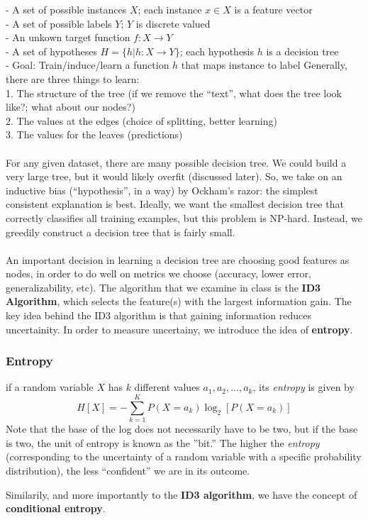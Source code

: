 \documentclass[11 pt]{scrartcl}
\begin{document}
- A set of possible instances $X$; each instance $x \in X$ is a feature vector \\
- A set of possible labels $Y$; $Y$ is discrete valued \\
- An unkown target function $f : X \rightarrow Y$ \\
- A set of hypotheses $H = \{ h | h: X \rightarrow Y\}$; each hypothesis $h$ is a decision tree \\
- Goal: Train/induce/learn a function $h$ that maps instance to label
\newpage Generally, there are three things to learn: \\
1. The structure of the tree (if we remove the ``text'', what does the tree look like?; what about our nodes?) \\
2. The values at the edges (choice of splitting, better learning) \\
3. The values for the leaves (predictions) \\\\
For any given dataset, there are many possible decision tree. We could build a very large tree, but it would likely overfit (discussed later). So, we take on an inductive bias (``hypothesis'', in a way) by Ockham's razor: the simplest consistent explanation is best. Ideally, we want the smallest decision tree that correctly classifies all training examples, but this problem is NP-hard. Instead, we greedily construct a decision tree that is fairly small. \\\\
An important decision in learning a decision tree are choosing good features as nodes, in order to do well on metrics we choose (accuracy, lower error, generalizability, etc). The algorithm that we examine in class is the \textbf{ID3 Algorithm}, which selects the feature(s) with the largest information gain. The key idea behind the ID3 algorithm is that gaining information reduces uncertainity. In order to measure uncertainy, we introduce the idea of \textbf{entropy}. 
\subsubsection{Entropy}
\begin{definition}
    if a random variable $X$ has $k$ different values $a_1, a_2, \hdots, a_k$, its \emph{entropy} is given by
    \[H[X] = -\sum_{k = 1}^KP(X = a_k)\log_2 \left[P(X = a_k) \right] \]
Note that the base of the log does not necessarily have to be two, but if the base is two, the unit of entropy is known as the ''bit.'' The higher the \emph{entropy} (corresponding to the uncertainty of a random variable with a specific probability distribution), the less ``confident'' we are in its outcome. 
\end{definition}
Similarily, and more importantly to the \textbf{ID3 algorithm}, we have the concept of \textbf{conditional entropy}.
\end{document}
